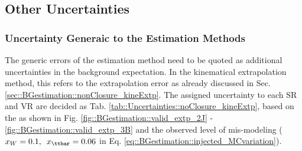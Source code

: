\clearpage
\subsection{Other Uncertainties} 
\subsubsection{Uncertainty Generaic to the Estimation Methods}  \label{sec::Uncertainties::nonClosure}
The generic errors of the estimation method need to be quoted as additional uncertainties in the background expectation. 
In the kinematical extrapolation method, this refers to the extrapolation error as already discussed in Sec. \ref{sec::BGestimation::nonClosure_kineExtp}. 
The assigned uncertainty to each SR and VR are decided as Tab. \ref{tab::Uncertainties::noClosure_kineExtp}, based on the 
as shown in Fig. \ref{fig::BGestimation::valid_extp_2J} - \ref{fig::BGestimation::valid_extp_3B} and the observed level of mis-modeling ($x_W=0.1, \,\,\, x_{\ttbar}=0.06$ in Eq. \ref{eq::BGestimation::injected_MCvariation}).


